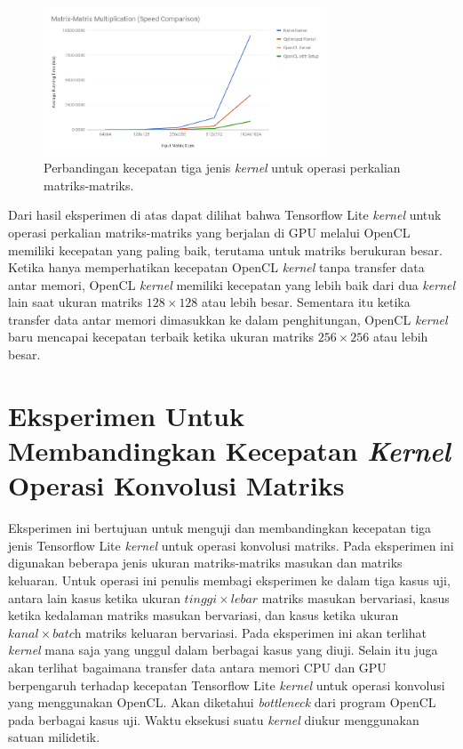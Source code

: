 \begin{figure}
	\centering
	\includegraphics[width=0.75\textwidth]
	{pics/matmatmul.png}
	\caption{Perbandingan kecepatan tiga jenis \textit{kernel} untuk operasi perkalian matriks-matriks.}
	\label{fig:matmatmul}
\end{figure}

Dari hasil eksperimen di atas dapat dilihat bahwa Tensorflow Lite \textit{kernel} untuk operasi perkalian matriks-matriks yang berjalan di GPU melalui OpenCL memiliki kecepatan yang paling baik, terutama untuk matriks berukuran besar. Ketika hanya memperhatikan kecepatan OpenCL \textit{kernel} tanpa transfer data antar memori, OpenCL \textit{kernel} memiliki kecepatan yang lebih baik dari dua \textit{kernel} lain saat ukuran matriks $128 \times 128$ atau lebih besar. Sementara itu ketika transfer data antar memori dimasukkan ke dalam penghitungan, OpenCL \textit{kernel} baru mencapai kecepatan terbaik ketika ukuran matriks $256 \times 256$ atau lebih besar.

\section{Eksperimen Untuk Membandingkan Kecepatan \textit{Kernel} Operasi Konvolusi Matriks }
Eksperimen ini bertujuan untuk menguji dan membandingkan kecepatan tiga jenis Tensorflow Lite \textit{kernel} untuk operasi konvolusi matriks. Pada eksperimen ini digunakan beberapa jenis ukuran matriks-matriks masukan dan matriks keluaran. Untuk operasi ini penulis membagi eksperimen ke dalam tiga kasus uji, antara lain kasus ketika ukuran $tinggi \times lebar$ matriks masukan bervariasi, kasus ketika kedalaman matriks masukan bervariasi, dan kasus ketika ukuran $kanal \times \textit{batch}$ matriks keluaran bervariasi. Pada eksperimen ini akan terlihat \textit{kernel} mana saja yang unggul dalam berbagai kasus yang diuji. Selain itu juga akan terlihat bagaimana transfer data antara memori CPU dan GPU berpengaruh terhadap kecepatan Tensorflow Lite \textit{kernel} untuk operasi konvolusi yang menggunakan OpenCL. Akan diketahui \textit{bottleneck} dari program OpenCL pada berbagai kasus uji. Waktu eksekusi suatu \textit{kernel} diukur menggunakan satuan milidetik.

